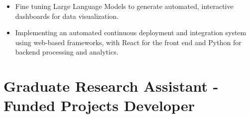 \documentclass[10pt, letterpaper]{article}
\newenvironment{highlights}{
    \begin{itemize}[
        topsep=0.10 cm,
        parsep=0.10 cm,
        partopsep=0pt,
        itemsep=0pt,
        leftmargin=0 cm + 10pt
    ]
}{
    \end{itemize}
} %
\begin{document}
    \begin{highlights}  
        \item Fine tuning Large Language Models to generate automated, interactive dashboards for data visualization.  
        \item Implementing an automated continuous deployment and integration system using web-based frameworks, with React for the front end and Python for backend processing and analytics.  
    \end{highlights}  
    
        \vspace{0.3cm} 




    \section*{Graduate Research Assistant - Funded Projects Developer}
    \small
\end{document}
